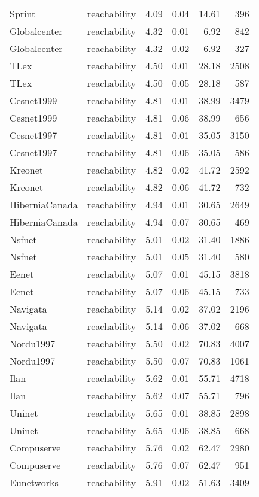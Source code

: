 \begin{tabular}{llrrrr}
Sprint & reachability & 4.09 & 0.04 & 14.61 & 396 \\
Globalcenter & reachability & 4.32 & 0.01 & 6.92 & 842 \\
Globalcenter & reachability & 4.32 & 0.02 & 6.92 & 327 \\
TLex & reachability & 4.50 & 0.01 & 28.18 & 2508 \\
TLex & reachability & 4.50 & 0.05 & 28.18 & 587 \\
Cesnet1999 & reachability & 4.81 & 0.01 & 38.99 & 3479 \\
Cesnet1999 & reachability & 4.81 & 0.06 & 38.99 & 656 \\
Cesnet1997 & reachability & 4.81 & 0.01 & 35.05 & 3150 \\
Cesnet1997 & reachability & 4.81 & 0.06 & 35.05 & 586 \\
Kreonet & reachability & 4.82 & 0.02 & 41.72 & 2592 \\
Kreonet & reachability & 4.82 & 0.06 & 41.72 & 732 \\
HiberniaCanada & reachability & 4.94 & 0.01 & 30.65 & 2649 \\
HiberniaCanada & reachability & 4.94 & 0.07 & 30.65 & 469 \\
Nsfnet & reachability & 5.01 & 0.02 & 31.40 & 1886 \\
Nsfnet & reachability & 5.01 & 0.05 & 31.40 & 580 \\
Eenet & reachability & 5.07 & 0.01 & 45.15 & 3818 \\
Eenet & reachability & 5.07 & 0.06 & 45.15 & 733 \\
Navigata & reachability & 5.14 & 0.02 & 37.02 & 2196 \\
Navigata & reachability & 5.14 & 0.06 & 37.02 & 668 \\
Nordu1997 & reachability & 5.50 & 0.02 & 70.83 & 4007 \\
Nordu1997 & reachability & 5.50 & 0.07 & 70.83 & 1061 \\
Ilan & reachability & 5.62 & 0.01 & 55.71 & 4718 \\
Ilan & reachability & 5.62 & 0.07 & 55.71 & 796 \\
Uninet & reachability & 5.65 & 0.01 & 38.85 & 2898 \\
Uninet & reachability & 5.65 & 0.06 & 38.85 & 668 \\
Compuserve & reachability & 5.76 & 0.02 & 62.47 & 2980 \\
Compuserve & reachability & 5.76 & 0.07 & 62.47 & 951 \\
Eunetworks & reachability & 5.91 & 0.02 & 51.63 & 3409 \\

\end{tabular}
